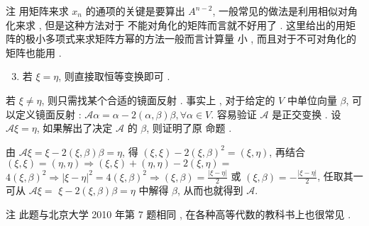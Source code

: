 \documentclass[10pt]{article}
\begin{document}
 注   用矩阵来求  $x_{n}$  的通项的关键是要算出  $A^{n-2}$, 一般常见的做法是利用相似对角化来求 ,  但是这种方法对于   不能对角化的矩阵而言就不好用了 .  这里给出的用矩阵的极小多项式来求矩阵方幂的方法一般而言计算量   小 ,  而且对于不可对角化的矩阵也能用 .

\begin{enumerate}
  \setcounter{enumi}{2}
  \item  若  $\xi=\eta$,  则直接取恒等变换即可 .
\end{enumerate}
 若  $\xi \neq \eta$,  则只需找某个合适的镜面反射 .  事实上 ,  对于给定的  $V$  中单位向量  $\beta$,  可以定义镜面反射 : $\mathscr{A} \alpha=\alpha-2(\alpha, \beta) \beta, \forall \alpha \in V$.  容易验证  $\mathscr{A}$  是正交变换 .  设  $\mathscr{A} \xi=\eta$,  如果解出了决定  $\mathscr{A}$  的  $\beta$,  则证明了原   命题 .

 由  $\mathscr{A} \xi=\xi-2(\xi, \beta) \beta=\eta$,  得  $(\xi, \xi)-2(\xi, \beta)^{2}=(\xi, \eta)$,  再结合  $(\xi, \xi)=(\eta, \eta) \Longrightarrow(\xi, \xi)+(\eta, \eta)-2(\xi, \eta)=$ $4(\xi, \beta)^{2} \Longrightarrow|\xi-\eta|^{2}=4(\xi, \beta)^{2} \Longrightarrow(\xi, \beta)=\frac{|\xi-\eta|}{2}$  或  $(\xi, \beta)=-\frac{|\xi-\eta|}{2}$,  任取其一可从  $\mathscr{A} \xi=$ $\xi-2(\xi, \beta) \beta=\eta$  中解得  $\beta$,  从而也就得到  $\mathscr{A}$.

 注   此题与北京大学  2010  年第  7  题相同 ,  在各种高等代数的教科书上也很常见 .
\end{document}

